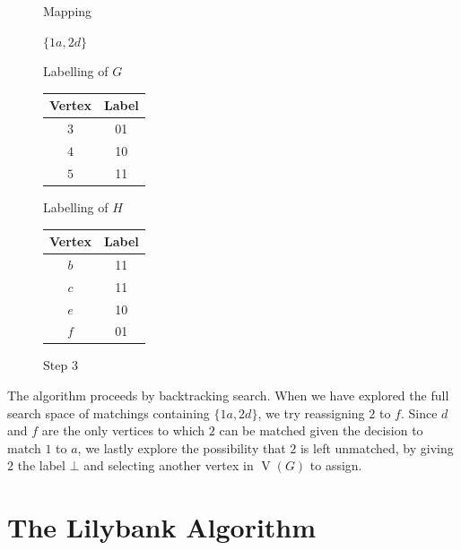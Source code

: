 \documentclass[letterpaper]{article}
\DeclareMathOperator{\V}{V}
\begin{document}
\begin{figure}[ht]
\centering
\begin{minipage}[t]{0.15\linewidth}
    Mapping

    \bigskip

    $\{1a, 2d\}$
\end{minipage}
\quad
\begin{minipage}[t]{0.3\linewidth}
    Labelling of $G$
    \begin{tabular}[t]{cc}
    \hline
        Vertex & Label\\
    \hline
        $3$ & 01 \\
        $4$ & 10 \\
        $5$ & 11 \\
    \hline
    \end{tabular}
\end{minipage}
\quad
\begin{minipage}[t]{0.3\linewidth}
    Labelling of $H$
    \begin{tabular}[t]{cc}
    \hline
        Vertex & Label\\
    \hline
        $b$ & 11 \\
        $c$ & 11 \\
        $e$ & 10 \\
        $f$ & 01 \\
    \hline
    \end{tabular}
\end{minipage}
\caption{Step 3}
\label{fig:alg3}
\end{figure}

The algorithm proceeds by backtracking search. When we have explored the full
search space of matchings containing $\{1a, 2d\}$, we try reassigning $2$ to
$f$.  Since $d$ and $f$ are the only vertices to which $2$ can be matched given
the decision to match $1$ to $a$, we lastly explore the possibility that $2$ is
left unmatched, by giving $2$ the label $\bot$ and selecting another vertex in
$\V(G)$ to assign.



\section{The Lilybank Algorithm}
\end{document}
